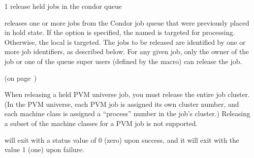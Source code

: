 \begin{ManPage}{\label{man-condor-release}}{1}
{release held jobs in the condor queue}
\Synopsis {}
\ToolArgs
{}


\Description

 releases one or more jobs from the Condor job queue that were 
previously placed in hold state.  
If the  option is specified, the named  is targeted
for processing.  
Otherwise, the local  is targeted.
The jobs to be released are identified by one or more job identifiers, as
described below.
For any given job, only the owner of the job or one of the queue super users
(defined by the  macro) can release the job.

\begin{Options}
	\ToolArgsDesc
\end{Options}

\SeeAlso
{} (on page~\pageref{man-condor-hold})

\GenRem

When releasing a held PVM universe job, you must release the entire
job cluster.  (In the PVM universe, each PVM job is assigned its own
cluster number, and each machine class is assigned a ``process''
number in the job's cluster.)  Releasing a subset of the machine
classes for a PVM job is not supported.

\ExitStatus

 will exit with a status value of 0 (zero) upon success,
and it will exit with the value 1 (one) upon failure.

\end{ManPage}
